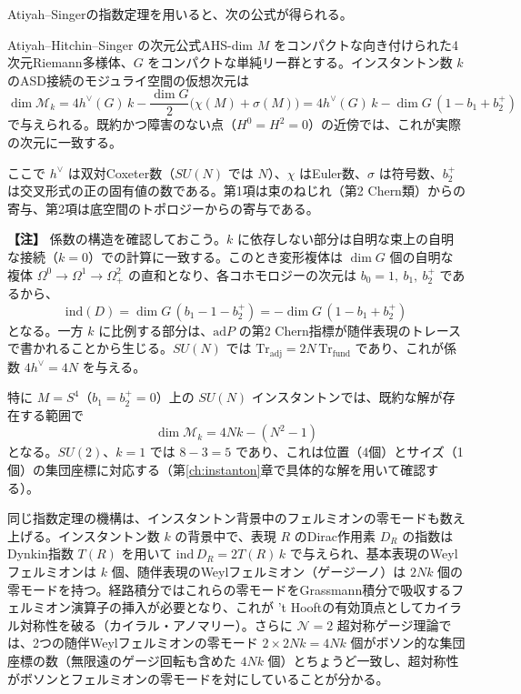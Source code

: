 \documentclass[uplatex, dvipdfmx, book]{jsbook}
\newenvironment{note}{\vspace{1ex}\par\footnotesize\noindent\textbf{【注】}}{\par\vspace{1ex}}
\begin{document}
Atiyah--Singerの指数定理を用いると、次の公式が得られる\cite{ahs1978}。

\begin{mythm}{Atiyah--Hitchin--Singer の次元公式}{AHS-dim}
$M$ をコンパクトな向き付けられた4次元Riemann多様体、$G$ をコンパクトな単純リー群とする。インスタントン数 $k$ のASD接続のモジュライ空間の仮想次元は
\begin{equation*}
    \dim \mathcal{M}_k = 4 h^\vee(G)\, k - \frac{\dim G}{2}\bigl(\chi(M) + \sigma(M)\bigr) = 4 h^\vee(G)\, k - \dim G\,(1 - b_1 + b_2^+)
\end{equation*}
で与えられる。既約かつ障害のない点（$H^0 = H^2 = 0$）の近傍では、これが実際の次元に一致する。
\end{mythm}

ここで $h^\vee$ は双対Coxeter数（$SU(N)$ では $N$）、$\chi$ はEuler数、$\sigma$ は符号数、$b_2^+$ は交叉形式の正の固有値の数である。第1項は束のねじれ（第2 Chern類）からの寄与、第2項は底空間のトポロジーからの寄与である。

\begin{note}
係数の構造を確認しておこう。$k$ に依存しない部分は自明な束上の自明な接続（$k=0$）での計算に一致する。このとき変形複体は $\dim G$ 個の自明な複体 $\Omega^0 \to \Omega^1 \to \Omega^2_+$ の直和となり、各コホモロジーの次元は $b_0 = 1,\ b_1,\ b_2^+$ であるから、
\begin{equation}
    \mathrm{ind}(D) = \dim G\,(b_1 - 1 - b_2^+) = -\dim G\,(1 - b_1 + b_2^+)
\end{equation}
となる。一方 $k$ に比例する部分は、$\mathrm{ad}P$ の第2 Chern指標が随伴表現のトレースで書かれることから生じる。$SU(N)$ では $\mathrm{Tr}_{\mathrm{adj}} = 2N\,\mathrm{Tr}_{\mathrm{fund}}$ であり、これが係数 $4h^\vee = 4N$ を与える。
\end{note}

特に $M = S^4$（$b_1 = b_2^+ = 0$）上の $SU(N)$ インスタントンでは、既約な解が存在する範囲で
\begin{equation}
    \dim \mathcal{M}_k = 4N k - (N^2 - 1)
\end{equation}
となる。$SU(2)$、$k = 1$ では $8 - 3 = 5$ であり、これは位置（4個）とサイズ（1個）の集団座標に対応する（第\ref{ch:instanton}章で具体的な解を用いて確認する）。

同じ指数定理の機構は、インスタントン背景中のフェルミオンの零モードも数え上げる。インスタントン数 $k$ の背景中で、表現 $R$ のDirac作用素 $D_R$ の指数はDynkin指数 $T(R)$ を用いて $\mathrm{ind}\, D_R = 2T(R)\,k$ で与えられ、基本表現のWeylフェルミオンは $k$ 個、随伴表現のWeylフェルミオン（ゲージーノ）は $2Nk$ 個の零モードを持つ。経路積分ではこれらの零モードをGrassmann積分で吸収するフェルミオン演算子の挿入が必要となり、これが 't Hooftの有効頂点\cite{thooft1976}としてカイラル対称性を破る（カイラル・アノマリー）。さらに $\mathcal{N}=2$ 超対称ゲージ理論では、2つの随伴Weylフェルミオンの零モード $2 \times 2Nk = 4Nk$ 個がボソン的な集団座標の数（無限遠のゲージ回転も含めた $4Nk$ 個）とちょうど一致し、超対称性がボソンとフェルミオンの零モードを対にしていることが分かる。
\end{document}
